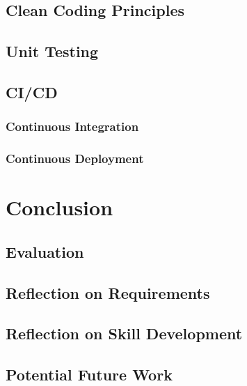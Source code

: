 \documentclass[a4paper,11pt]{report}
\begin{document}
\section{Clean Coding Principles}
\section{Unit Testing}
\section{CI/CD}
\subsection{Continuous Integration}
\subsection{Continuous Deployment}

\chapter{Conclusion}
\section{Evaluation}
\section{Reflection on Requirements}
\section{Reflection on Skill Development}
\section{Potential Future Work}
\end{document}

